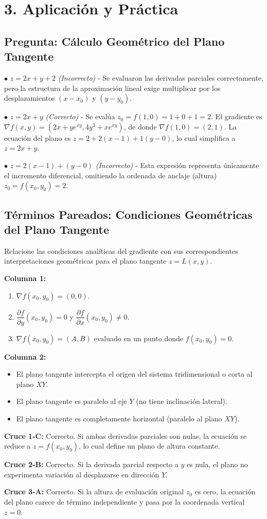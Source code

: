 \documentclass[11pt]{article}
\newenvironment{aplicacion}{%
  \section*{3. Aplicación y Práctica}%
}{}
\newenvironment{preguntaalternativas}[1]{\subsection*{Pregunta: #1}\par\vspace{0.1cm}}{\vspace{0.3cm}}
\newcommand{\opcion}[3]{\par\noindent $\bullet$ \textbf{#1} \textit{(#2)} - #3\par\vspace{0.15cm}}
\newenvironment{pareados}[1]{\subsection*{Términos Pareados: #1}}{\vspace{0.3cm}}
\newcommand{\columnaI}[1]{\textbf{Columna 1:}\begin{enumerate}#1\end{enumerate}}
\newcommand{\columnaII}[1]{\textbf{Columna 2:}\begin{itemize}#1\end{itemize}}
\newcommand{\pareo}[2]{\textbf{Cruce #1:} #2\par}
\begin{document}
\begin{aplicacion}
\begin{preguntaalternativas}{Cálculo Geométrico del Plano Tangente}
    \opcion{$z = 2x + y + 2$}{Incorrecto}{Se evaluaron las derivadas parciales correctamente, pero la estructura de la aproximación lineal exige multiplicar por los desplazamientos $(x - x_0)$ y $(y - y_0)$.}
    \opcion{$z = 2x + y$}{Correcto}{Se evalúa $z_0 = f(1,0) = 1 + 0 + 1 = 2$. El gradiente es $\nabla f(x,y) = (2x + y e^{xy}, 4y^3 + x e^{xy})$, de donde $\nabla f(1,0) = (2, 1)$. La ecuación del plano es $z = 2 + 2(x-1) + 1(y-0)$, lo cual simplifica a $z = 2x + y$.}
    \opcion{$z = 2(x-1) + (y-0)$}{Incorrecto}{Esta expresión representa únicamente el incremento diferencial, omitiendo la ordenada de anclaje (altura) $z_0 = f(x_0, y_0) = 2$.}
  \end{preguntaalternativas}

  \begin{pareados}{Condiciones Geométricas del Plano Tangente}
    Relacione las condiciones analíticas del gradiente con sus correspondientes interpretaciones geométricas para el plano tangente $z = L(x,y)$.

    \columnaI{
      \item $\nabla f(x_0, y_0) = (0,0)$.
      \item $\dfrac{\partial f}{\partial y}(x_0, y_0) = 0$ y $\dfrac{\partial f}{\partial x}(x_0, y_0) \neq 0$.
      \item $\nabla f(x_0, y_0) = (A, B)$ evaluado en un punto donde $f(x_0,y_0) = 0$.
    }

    \columnaII{
      \item El plano tangente intercepta el origen del sistema tridimensional o corta al plano $XY$.
      \item El plano tangente es paralelo al eje $Y$ (no tiene inclinación lateral).
      \item El plano tangente es completamente horizontal (paralelo al plano $XY$).
    }

    \pareo{1-C}{Correcto. Si ambas derivadas parciales son nulas, la ecuación se reduce a $z = f(x_0,y_0)$, lo cual define un plano de altura constante.}
    \pareo{2-B}{Correcto. Si la derivada parcial respecto a $y$ es nula, el plano no experimenta variación al desplazarse en dirección $Y$.}
    \pareo{3-A}{Correcto. Si la altura de evaluación original $z_0$ es cero, la ecuación del plano carece de término independiente y pasa por la coordenada vertical $z=0$.}
  \end{pareados}

\end{aplicacion}
\end{document}
